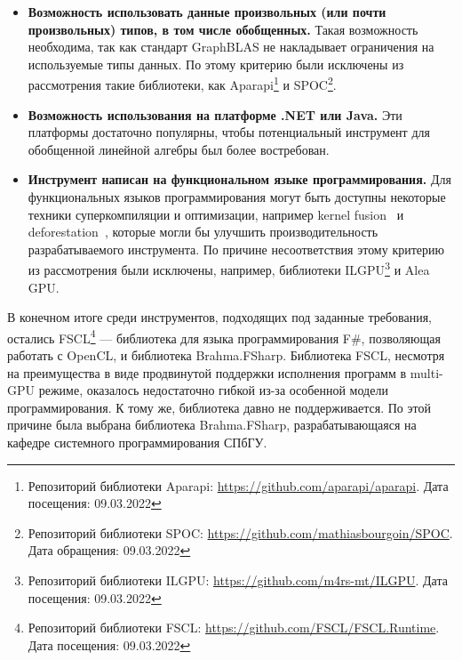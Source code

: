 \begin{itemize}
    \item \textbf{Возможность использовать данные произвольных (или почти произвольных) типов, в том числе обобщенных.} Такая возможность необходима, так как стандарт GraphBLAS не накладывает ограничения на используемые типы данных. По этому критерию были исключены из рассмотрения такие библиотеки, как Aparapi\footnote{Репозиторий библиотеки Aparapi: \url{https://github.com/aparapi/aparapi}. Дата посещения: 09.03.2022} и SPOC\footnote{Репозиторий библиотеки SPOC: \url{https://github.com/mathiasbourgoin/SPOC}. Дата обращения: 09.03.2022}.
    \item \textbf{Возможность использования на платформе .NET или Java.} Эти платформы достаточно популярны, чтобы потенциальный инструмент для обобщенной линейной алгебры был более востребован.
    \item \textbf{Инструмент написан на функциональном языке программирования.} Для функциональных языков программирования могут быть доступны некоторые техники суперкомпиляции и оптимизации, например kernel fusion~\cite{fusion} и deforestation~\cite{deforset}, которые могли бы улучшить производительность разрабатываемого инструмента. По причине несоответствия этому критерию из рассмотрения были исключены, например, библиотеки ILGPU\footnote{Репозиторий библиотеки ILGPU: \url{https://github.com/m4rs-mt/ILGPU}. Дата посещения: 09.03.2022} и Alea GPU.
\end{itemize} 

В конечном итоге среди инструментов, подходящих под заданные требования, остались FSCL\footnote{Репозиторий библиотеки FSCL: \url{https://github.com/FSCL/FSCL.Runtime}. Дата посещения: 09.03.2022} --- библиотека для языка программирования F\#, позволяющая работать с OpenCL, и библиотека Brahma.FSharp. Библиотека FSCL, несмотря на преимущества в виде продвинутой поддержки исполнения программ в multi-GPU режиме, оказалось недостаточно гибкой из-за особенной модели программирования. К тому же, библиотека давно не поддерживается. По этой причине была выбрана библиотека Brahma.FSharp, разрабатывающаяся на кафедре системного программирования СПбГУ.

